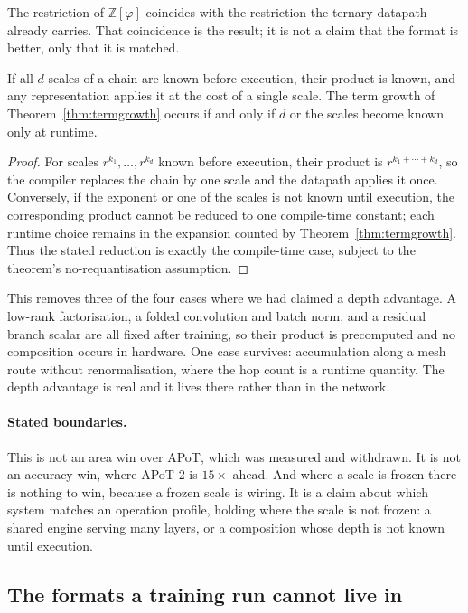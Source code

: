 The restriction of $\mathbb{Z}[\varphi]$ coincides with the restriction the
ternary datapath already carries. That coincidence is the result; it is not a
claim that the format is better, only that it is matched.

\begin{theorem}
\label{thm:compilecomp}
If all $d$ scales of a chain are known before execution, their product is known,
and any representation applies it at the cost of a single scale. The term growth
of Theorem~\ref{thm:termgrowth} occurs if and only if $d$ or the scales become
known only at runtime.
\end{theorem}
\begin{proof}
For scales $r^{k_1},\ldots,r^{k_d}$ known before execution, their product is
$r^{k_1+\cdots+k_d}$, so the compiler replaces the chain by one scale and the
datapath applies it once.  Conversely, if the exponent or one of the scales is
not known until execution, the corresponding product cannot be reduced to one
compile-time constant; each runtime choice remains in the expansion counted by
Theorem~\ref{thm:termgrowth}.  Thus the stated reduction is exactly the
compile-time case, subject to the theorem's no-requantisation assumption.
\end{proof}

This removes three of the four cases where we had claimed a depth advantage. A
low-rank factorisation, a folded convolution and batch norm, and a residual
branch scalar are all fixed after training, so their product is precomputed and
no composition occurs in hardware. One case survives: accumulation along a mesh
route without renormalisation, where the hop count is a runtime quantity. The
depth advantage is real and it lives there rather than in the network.

\paragraph{Stated boundaries.} This is not an area win over APoT, which was
measured and withdrawn. It is not an accuracy win, where APoT-2 is $15\times$
ahead. And where a scale is frozen there is nothing to win, because a frozen
scale is wiring. It is a claim about which system matches an operation profile,
holding where the scale is not frozen: a shared engine serving many layers, or a
composition whose depth is not known until execution.


\subsection{The formats a training run cannot live in}

